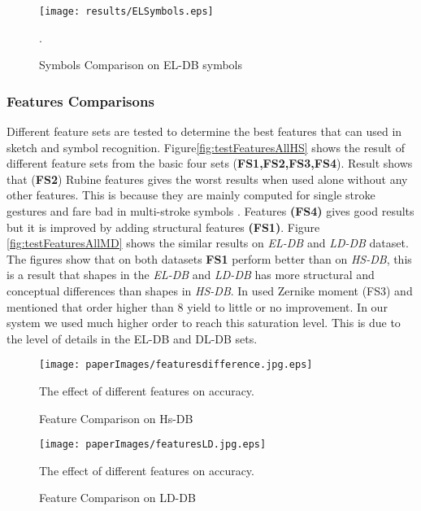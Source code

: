 \begin{figure}
	\centering
		\texttt{[image: results/ELSymbols.eps]}
	\caption{Symbols Comparison on EL-DB symbols}.  %
	\label{fig:ELtest2}
\end{figure}  
 
 
\subsubsection{Features Comparisons}
\label{sec:featuresComparisions}
Different feature sets are tested to determine the best features that can used in sketch and symbol recognition. Figure\ref{fig:testFeaturesAllHS} shows the result of different feature sets from the basic four sets (\textbf{FS1,FS2,FS3,FS4}). Result shows that (\textbf{FS2}) Rubine features \cite{gestureexample12} gives the worst results when used alone without any other features. This is because they are mainly computed for single stroke gestures and fare bad in multi-stroke symbols \cite{compareFeaturSVM}. Features \textbf{(FS4)} gives good results but it is improved by adding structural features \textbf{(FS1)}.  Figure \ref{fig:testFeaturesAllMD} shows the similar results on \textsl{EL-DB} and \textsl{LD-DB} dataset. The figures show that on both datasets \textbf{FS1} perform better than on \textsl{HS-DB}, this is a result that shapes in the \textsl{EL-DB} and \textsl{LD-DB} has more structural and conceptual differences than shapes in \textsl{HS-DB}. In \cite{HeloiseBeautification} used Zernike moment (FS3) and mentioned that order higher than 8 yield to little or no improvement. In our system we used much higher order to reach this saturation level. This is due to the level of details in the EL-DB and DL-DB sets. %
 \begin{figure}
	\centering
		\texttt{[image: paperImages/featuresdifference.jpg.eps]}
	\caption{Feature Comparison on Hs-DB} The effect of different features on accuracy.  %
	\label{fig:testFeaturesAll}
\end{figure}  


 \begin{figure}
	\centering
		\texttt{[image: paperImages/featuresLD.jpg.eps]}
	\caption{Feature Comparison on LD-DB} The effect of different features on accuracy.  %
	\label{fig:testFeaturesAll}
\end{figure}  


